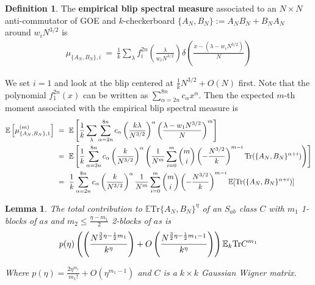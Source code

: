 \documentclass[12pt,reqno]{amsart}
\theoremstyle{plain} %
\newtheorem{lemma}[theorem]{Lemma}
\theoremstyle{remark}
\theoremstyle{definition}
\newtheorem*{defn}{Definition}
\renewcommand{\a}{\alpha}
\begin{document}
\begin{defn}
The \textbf{empirical blip spectral measure} associated to an $N\times N$ anti-commutator of GOE and $k$-checkerboard $\{A_N,B_N\}:= A_NB_N+B_NA_N$ around $w_iN^{3/2}$ is
\begin{align*}
\mu_{\{A_N,B_N\},i} \ = \ \frac{1}{k}\sum_{\lambda}f_i^{2n}\left(\frac{\lambda}{w_iN^{3/2}}\right)\delta\left(\frac{x-\left(\lambda-w_iN^{3/2}\right)}{N}\right)
\end{align*}
\end{defn}

We set $i=1$ and look at the blip centered at $\frac{1}{k}N^{3/2}+O(N)$ first. Note that the polynomial $f_1^{2n}(x)$ can be written as $\sum_{\a=2n}^{8n}c_\a x^\a$. Then the expected $m$-th moment associated with the empirical blip spectral measure is
\begin{align*}
\mathbb{E}\left[\mu_{\{A_N,B_N\},1}^{(m)}\right] &\ = \ \mathbb{E}\left[\frac{1}{k}\sum_{\lambda}\sum_{\a=2n}^{8n}c_\a\left(\frac{k\lambda}{N^{3/2}}\right)^\a\left(\frac{\lambda-w_1N^{3/2}}{N}\right)^{m}\right] \\
&\ = \ \mathbb{E}\left[\frac{1}{k}\sum_{\a=2n}^{8n}c_\a\left(\frac{k}{N^{3/2}}\right)^\a\left(\frac{1}{N^m}\sum_{i=0}^m \binom{m}{i}\left(-\frac{N^{3/2}}{k}\right)^{m-i}\textup{Tr}(\{A_N,B_N\}^{\a+i})\right)\right] \\
&\ = \ \frac{1}{k}\sum_{\a=2n}^{8n}c_\a\left(\frac{k}{N^{3/2}}\right)^\a\frac{1}{N^m}\sum_{i=0}^m \binom{m}{i}\left(-\frac{N^{3/2}}{k}\right)^{m-i}\mathbb{E}[\textup{Tr}(\{A_N,B_N\}^{\a+i})]
\end{align*}

\begin{lemma}\label{Sclasscontribution} The total contribution to $\mathbb{E}\text{Tr}\{A_N,B_N\}^\eta$ of an $S_{ab}$ class $C$ with $m_1$ 1-blocks of $a$s and $m_2\leq \frac{\eta-m_1}{2}$ 2-blocks of $a$s is 
\[
p(\eta)\left(\left(\frac{N^{\frac{3}{2}\eta -\frac{1}{2}m_1}}{k^{\eta}}\right) + O\left(\frac{N^{\frac{3}{2}\eta -\frac{1}{2}m_1-1}}{k^\eta}\right)\right)\mathbb{E}_k\textup{Tr}C^{m_1}
\]

Where $p(\eta)=\frac{2\eta^{m_1}}{m_1!}+O(\eta^{m_1-1})$ and $C$ is a $k\times k$ Gaussian Wigner matrix.
\end{lemma}
\end{document}
